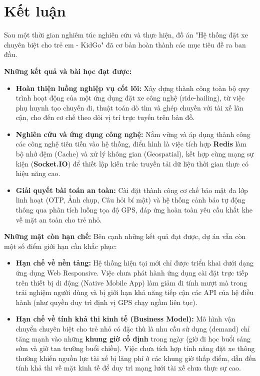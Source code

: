 \documentclass[../DoAn.tex]{subfiles}
\begin{document}
\section{Kết luận}
Sau một thời gian nghiêm túc nghiên cứu và thực hiện, đồ án "Hệ thống đặt xe chuyên biệt cho trẻ em - KidGo" đã cơ bản hoàn thành các mục tiêu đề ra ban đầu.

\textbf{Những kết quả và bài học đạt được:}
\begin{itemize}
    \item \textbf{Hoàn thiện luồng nghiệp vụ cốt lõi:} Xây dựng thành công toàn bộ quy trình hoạt động của một ứng dụng đặt xe công nghệ (ride-hailing), từ việc phụ huynh tạo chuyến đi, thuật toán dò tìm và ghép chuyến với tài xế lân cận, cho đến cơ chế theo dõi vị trí trực tuyến trên bản đồ.
    \item \textbf{Nghiên cứu và ứng dụng công nghệ:} Nắm vững và áp dụng thành công các công nghệ tiên tiến vào hệ thống, điển hình là việc tích hợp \textbf{Redis} làm bộ nhớ đệm (Cache) và xử lý không gian (Geospatial), kết hợp cùng mạng sự kiện (\textbf{Socket.IO}) để thiết lập kiến trúc truyền tải dữ liệu thời gian thực có hiệu năng cao.
    \item \textbf{Giải quyết bài toán an toàn:} Cài đặt thành công cơ chế bảo mật đa lớp linh hoạt (OTP, Ảnh chụp, Câu hỏi bí mật) và hệ thống cảnh báo tự động thông qua phân tích luồng tọa độ GPS, đáp ứng hoàn toàn yêu cầu khắt khe về mặt an toàn cho trẻ nhỏ.
\end{itemize}

\textbf{Những mặt còn hạn chế:}
Bên cạnh những kết quả đạt được, dự án vẫn còn một số điểm giới hạn cần khắc phục:
\begin{itemize}
    \item \textbf{Hạn chế về nền tảng:} Hệ thống hiện tại mới chỉ được triển khai dưới dạng ứng dụng Web Responsive. Việc chưa phát hành ứng dụng cài đặt trực tiếp trên thiết bị di động (Native Mobile App) làm giảm đi tính mượt mà trong trải nghiệm người dùng và bị giới hạn khả năng tiếp cận các API của hệ điều hành (như quyền duy trì định vị GPS chạy ngầm liên tục).
    \item \textbf{Hạn chế về tính khả thi kinh tế (Business Model):} Mô hình vận chuyển chuyên biệt cho trẻ nhỏ có đặc thù là nhu cầu sử dụng (demand) chỉ tăng mạnh vào những \textbf{khung giờ cố định} trong ngày (giờ đi học buổi sáng sớm và giờ tan trường buổi chiều). Việc chưa tích hợp tính năng đặt xe thông thường khiến nguồn lực tài xế bị lãng phí ở các khung giờ thấp điểm, dẫn đến tính khả thi về mặt kinh tế để duy trì mạng lưới tài xế chưa thực sự cao.
\end{itemize}
\end{document}
